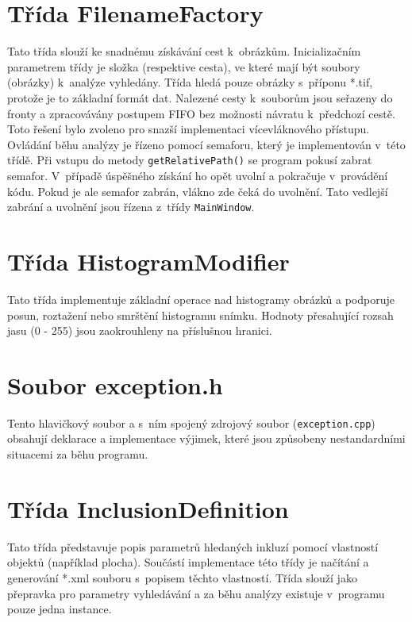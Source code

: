 \documentclass[12pt, a4paper]{report}
\begin{document}
\section{Třída FilenameFactory}
	Tato třída slouží ke snadnému získávání cest k~obrázkům. Inicializačním parametrem třídy je složka (respektive cesta), ve které mají být soubory (obrázky) k~analýze vyhledány. Třída hledá pouze obrázky s~příponu *.tif, protože je to základní formát dat. Nalezené cesty k~souborům jsou seřazeny do fronty a zpracovávány postupem FIFO bez možnosti návratu k~předchozí cestě. Toto řešení bylo zvoleno pro snazší implementaci vícevláknového přístupu. Ovládání běhu analýzy je řízeno pomocí semaforu, který je implementován v~této třídě. Při vstupu do metody \texttt{getRelativePath()} se program pokusí zabrat semafor. V~případě úspěšného získání ho opět uvolní a pokračuje v~provádění kódu. Pokud je ale semafor zabrán, vlákno zde čeká do uvolnění. Tato vedlejší zabrání a uvolnění jsou řízena z~třídy \texttt{MainWindow}.
	
\section{Třída HistogramModifier}
	Tato třída implementuje základní operace nad histogramy obrázků a podporuje posun, roztažení nebo smrštění histogramu snímku. Hodnoty přesahující rozsah jasu (0 - 255) jsou zaokrouhleny na příslušnou hranici.
	
\section{Soubor exception.h}
	Tento hlavičkový soubor a s~ním spojený zdrojový soubor (\texttt{exception.cpp}) obsahují deklarace a implementace výjimek, které jsou způsobeny nestandardními situacemi za běhu programu.  	
	
\section{Třída InclusionDefinition}
	Tato třída představuje popis parametrů hledaných inkluzí pomocí vlastností objektů (například plocha). Součástí implementace této třídy je načítání a generování *.xml souboru s~popisem těchto vlastností. Třída slouží jako přepravka pro parametry vyhledávání a za běhu analýzy existuje v~programu pouze jedna instance. 	
	
\end{document}

